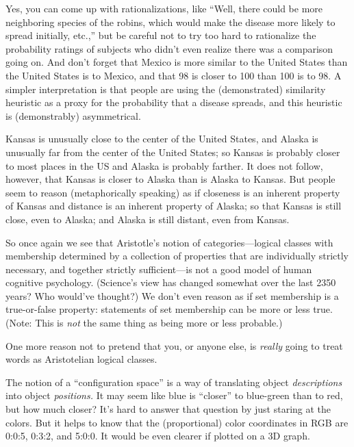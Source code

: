 {{{
 Yes, you can come up with rationalizations, like
``Well, there could be more neighboring species of the
robins, which would make the disease more likely to spread initially,
etc.,'' but be careful not to try too hard to
rationalize the probability ratings of subjects who
didn't even realize there was a comparison going on.
And don't forget that Mexico is more similar to the
United States than the United States is to Mexico, and that 98 is
closer to 100 than 100 is to 98. A simpler interpretation is that
people are using the (demonstrated) similarity heuristic as a proxy for
the probability that a disease spreads, and this heuristic is
(demonstrably) asymmetrical.}

{
 Kansas is unusually close to the center of the United States, and
Alaska is unusually far from the center of the United States; so Kansas
is probably closer to most places in the US and Alaska is probably
farther. It does not follow, however, that Kansas is closer to Alaska
than is Alaska to Kansas. But people seem to reason (metaphorically
speaking) as if closeness is an inherent property of Kansas and
distance is an inherent property of Alaska; so that Kansas is still
close, even to Alaska; and Alaska is still distant, even from Kansas.}

{
 So once again we see that Aristotle's notion of
categories---logical classes with membership determined by a collection
of properties that are individually strictly necessary, and together
strictly sufficient---is not a good model of human cognitive
psychology. (Science's view has changed somewhat over
the last 2350 years? Who would've thought?) We
don't even reason as if set membership is a
true-or-false property: statements of set membership can be more or
less true. (Note: This is \textit{not} the same thing as being more or
less probable.)}

{
 One more reason not to pretend that you, or anyone else, is
\textit{really} going to treat words as Aristotelian logical classes.}

\myendsectiontext


\bigskip


{
 The notion of a ``configuration
space'' is a way of translating object
\textit{descriptions} into object \textit{positions.} It may seem like
blue is ``closer'' to blue-green
than to red, but how much closer? It's hard to answer
that question by just staring at the colors. But it helps to know that
the (proportional) color coordinates in RGB are 0:0:5, 0:3:2, and
5:0:0. It would be even clearer if plotted on a 3D graph.}

}}
